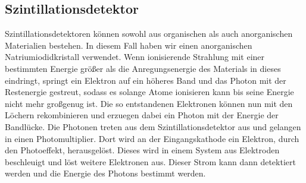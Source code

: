 \subsection{Szintillationsdetektor}
Szintillationsdetektoren können sowohl aus organischen als auch anorganischen
Materialien bestehen. In diesem Fall haben wir einen anorganischen
Natriumiodidkristall verwendet.
Wenn ionisierende Strahlung mit einer bestimmten Energie größer als
die Anregungsenergie des Materials in dieses eindringt, springt ein
Elektron auf ein höheres Band und das Photon mit der Restenergie gestreut,
sodass es solange Atome ionisieren kann bis seine Energie nicht mehr
großgenug ist. 
Die so entstandenen Elektronen können nun mit den Löchern rekombinieren und
erzuegen dabei ein Photon mit der Energie der Bandlücke.
Die Photonen treten aus dem Szintillationsdetektor aus und gelangen in einen
Photomultiplier.
Dort wird an der Eingangskathode ein Elektron, durch den Photoeffekt, herausgelöst.
Dieses wird in einem System aus Elektroden beschleuigt und löst weitere Elektronen aus.
Dieser Strom kann dann detektiert werden und die Energie des Photons bestimmt werden. 
